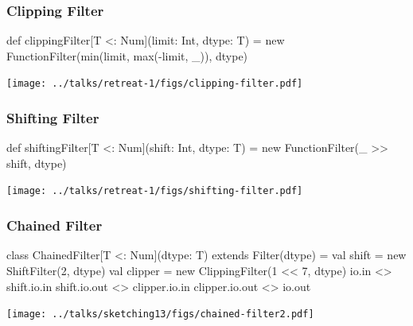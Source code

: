 \documentclass[xcolor=pdflatex,dvipsnames,table]{beamer}
\begin{document}
\begin{frame}[fragile]
\frametitle{Clipping Filter}

\begin{footnotesize}
\begin{scala}
def clippingFilter[T <: Num](limit: Int, dtype: T) = 
  new FunctionFilter(min(limit, max(-limit, _)), dtype)
\end{scala}
\end{footnotesize}

\begin{center}
\texttt{[image: ../talks/retreat-1/figs/clipping-filter.pdf]} 
\end{center}
\end{frame}


\begin{frame}[fragile]
\frametitle{Shifting Filter}

\begin{footnotesize}
\begin{scala}
def shiftingFilter[T <: Num](shift: Int, dtype: T) = 
  new FunctionFilter(_ >> shift, dtype)
\end{scala}
\end{footnotesize}

\begin{center}
\texttt{[image: ../talks/retreat-1/figs/shifting-filter.pdf]} 
\end{center}
\end{frame}

\begin{frame}[fragile]
\frametitle{Chained Filter}

\begin{footnotesize}
\begin{scala}
class ChainedFilter[T <: Num](dtype: T) extends Filter(dtype) = {
  val shift   = new ShiftFilter(2, dtype)
  val clipper = new ClippingFilter(1 << 7, dtype)
  io.in          <> shift.io.in
  shift.io.out   <> clipper.io.in
  clipper.io.out <> io.out
}
\end{scala}
\end{footnotesize}

\begin{center}
\texttt{[image: ../talks/sketching13/figs/chained-filter2.pdf]} 
\end{center}
\end{frame}
\end{document}
